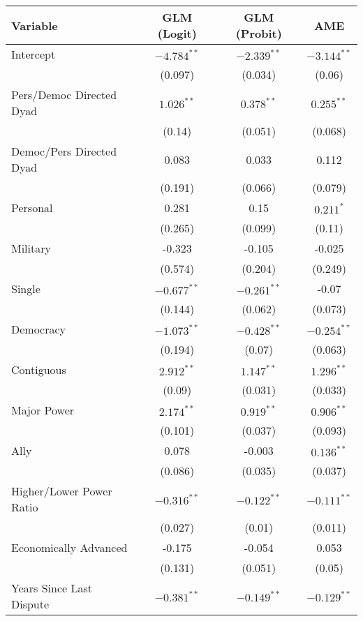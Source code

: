 \begin{table}[ht]
\centering
\begingroup\normalsize
\begin{tabular}{lccc}
 Variable & GLM (Logit) & GLM (Probit) & AME \\ 
  \hline
\hline
Intercept & $-4.784^{\ast\ast}$ & $-2.339^{\ast\ast}$ & $-3.144^{\ast\ast}$ \\ 
   & (0.097) & (0.034) & (0.06) \\ 
  Pers/Democ Directed Dyad & $1.026^{\ast\ast}$ & $0.378^{\ast\ast}$ & $0.255^{\ast\ast}$ \\ 
   & (0.14) & (0.051) & (0.068) \\ 
  Democ/Pers Directed Dyad & 0.083 & 0.033 & 0.112 \\ 
   & (0.191) & (0.066) & (0.079) \\ 
  Personal & 0.281 & 0.15 & $0.211^{\ast}$ \\ 
   & (0.265) & (0.099) & (0.11) \\ 
  Military & -0.323 & -0.105 & -0.025 \\ 
   & (0.574) & (0.204) & (0.249) \\ 
  Single & $-0.677^{\ast\ast}$ & $-0.261^{\ast\ast}$ & -0.07 \\ 
   & (0.144) & (0.062) & (0.073) \\ 
  Democracy & $-1.073^{\ast\ast}$ & $-0.428^{\ast\ast}$ & $-0.254^{\ast\ast}$ \\ 
   & (0.194) & (0.07) & (0.063) \\ 
  Contiguous & $2.912^{\ast\ast}$ & $1.147^{\ast\ast}$ & $1.296^{\ast\ast}$ \\ 
   & (0.09) & (0.031) & (0.033) \\ 
  Major Power & $2.174^{\ast\ast}$ & $0.919^{\ast\ast}$ & $0.906^{\ast\ast}$ \\ 
   & (0.101) & (0.037) & (0.093) \\ 
  Ally & 0.078 & -0.003 & $0.136^{\ast\ast}$ \\ 
   & (0.086) & (0.035) & (0.037) \\ 
  Higher/Lower Power Ratio & $-0.316^{\ast\ast}$ & $-0.122^{\ast\ast}$ & $-0.111^{\ast\ast}$ \\ 
   & (0.027) & (0.01) & (0.011) \\ 
  Economically Advanced & -0.175 & -0.054 & 0.053 \\ 
   & (0.131) & (0.051) & (0.05) \\ 
  Years Since Last Dispute & $-0.381^{\ast\ast}$ & $-0.149^{\ast\ast}$ & $-0.129^{\ast\ast}$ \\ 

\end{tabular}
\end{table}
